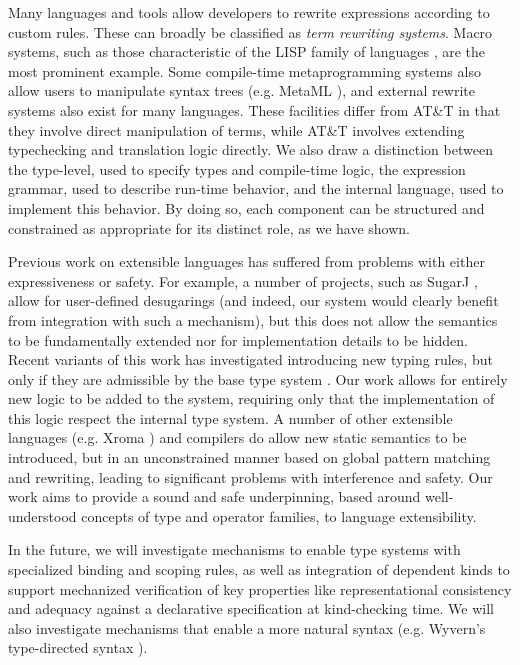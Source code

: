 \documentclass[9pt,preprint]{sigplanconf}
\begin{document}
Many languages and tools allow developers to rewrite expressions according to custom rules. These can broadly be classified as {\it term rewriting systems}. Macro systems, such as those characteristic of the LISP family of languages \cite{mccarthy1978history}, are the most prominent example. Some compile-time metaprogramming systems also allow users to manipulate syntax trees (e.g. MetaML \cite{Sheard:1999:UMS}), and external rewrite systems also exist for many languages.
These facilities differ from AT\&T in that they involve direct manipulation of terms, while AT\&T involves extending typechecking and translation logic directly. We also draw a distinction between the type-level, used to specify types and compile-time logic, the expression grammar, used to describe run-time behavior, and the internal language, used to implement this behavior. By doing so, each component can be structured and constrained as appropriate for its distinct role, as we have shown.

Previous work on extensible languages has suffered from problems with either expressiveness or safety. For example, a number of projects, such as SugarJ \cite{erdweg2011sugarj}, allow for user-defined desugarings (and indeed, our system would clearly benefit from integration with such a mechanism), but this does not allow the semantics to be fundamentally extended nor for implementation details to be hidden. Recent variants of this work has investigated introducing new typing rules, but only if they are admissible by the base type system \cite{erdwegicfp}. Our work allows for entirely new logic to be added to the system, requiring only that the implementation of this logic respect the internal type system. A number of other extensible languages (e.g. Xroma \cite{xroma}) and compilers do allow new static semantics to be introduced, but in an unconstrained manner based on global pattern matching and rewriting, leading to significant problems with interference and safety. Our work aims to provide a sound and safe underpinning, based around well-understood concepts of type and operator families, to language extensibility.

In the future, we will investigate mechanisms to enable type systems with specialized binding and scoping rules, as well as integration of dependent kinds to support mechanized verification of key properties like representational consistency and adequacy against a declarative specification at kind-checking time. We will also investigate mechanisms that enable a more natural syntax (e.g. Wyvern's type-directed syntax \cite{globaldsl}). 
\end{document}
